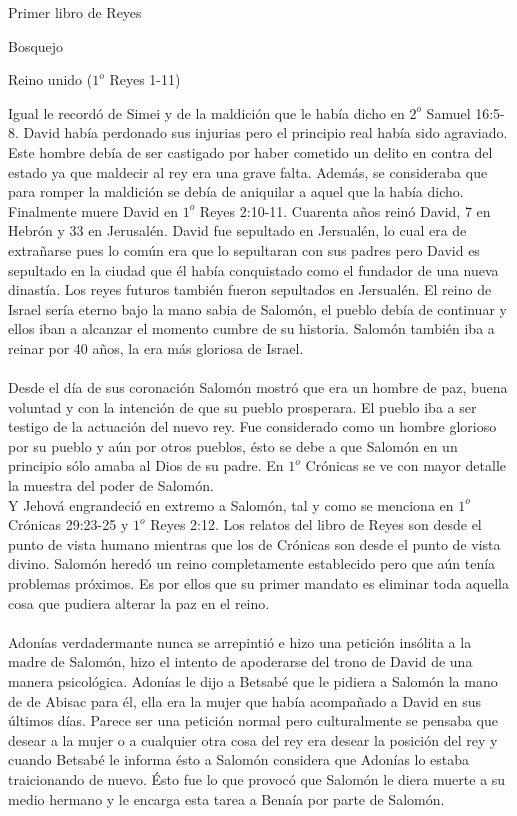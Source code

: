 \begin{section}{Primer libro de Reyes}
\begin{subsection}{Bosquejo}
\begin{subsubsection}{Reino unido ($1^{o}$ Reyes 1-11)}
\begin{enumerate}
					Igual le recordó de Simei y de la maldición que le había dicho en $2^{o}$ Samuel 16:5-8. David había perdonado sus injurias pero el principio real había sido agraviado. Este hombre debía de ser castigado por haber cometido un delito en contra del estado ya que maldecir al rey era una grave falta. Además, se consideraba que para romper la maldición se debía de aniquilar a aquel que la había dicho. Finalmente muere David en $1^{o}$ Reyes 2:10-11. Cuarenta años reinó David, 7 en Hebrón y 33 en Jerusalén. David fue sepultado en Jersualén, lo cual era de extrañarse pues lo común era que lo sepultaran con sus padres pero David es sepultado en la ciudad que él había conquistado como el fundador de una nueva dinastía. Los reyes futuros también fueron sepultados en Jersualén. El reino de Israel sería eterno bajo la mano sabia de Salomón, el pueblo debía de continuar y ellos iban a alcanzar el momento cumbre de su historia. Salomón también iba a reinar por 40 años, la era más gloriosa de Israel.\\ \\
					Desde el día de sus coronación Salomón mostró que era un hombre de paz, buena voluntad y con la intención de que su pueblo prosperara. El pueblo iba a ser testigo de la actuación del nuevo rey. Fue considerado como un hombre glorioso por su pueblo y aún por otros pueblos, ésto se debe a que Salomón en un principio sólo amaba al Dios de su padre. En $1^{o}$ Crónicas se ve con mayor detalle la muestra del poder de Salomón.\\
					Y Jehová engrandeció en extremo a Salomón, tal y como se menciona en $1^{o}$ Crónicas 29:23-25 y $1^{o}$ Reyes 2:12. Los relatos del libro de Reyes son desde el punto de vista humano mientras que los de Crónicas son desde el punto de vista divino. Salomón heredó un reino completamente establecido pero que aún tenía problemas próximos. Es por ellos que su primer mandato es eliminar toda aquella cosa que pudiera alterar la paz en el reino.\\ \\
					Adonías verdadermante nunca se arrepintió e hizo una petición insólita a la madre de Salomón, hizo el intento de apoderarse del trono de David de una manera psicológica. Adonías le dijo a Betsabé que le pidiera a Salomón la mano de de Abisac para él, ella era la mujer que había acompañado a David en sus últimos días.
					\newpage
					Parece ser una petición normal pero culturalmente se pensaba que desear a la mujer o a cualquier otra cosa del rey era desear la posición del rey y cuando Betsabé le informa ésto a Salomón considera que Adonías lo estaba traicionando de nuevo. Ésto fue lo que provocó que Salomón le diera muerte a su medio hermano y le encarga esta tarea a Benaía por parte de Salomón.\\

\end{enumerate}
\end{subsubsection}
\end{subsection}
\end{section}

